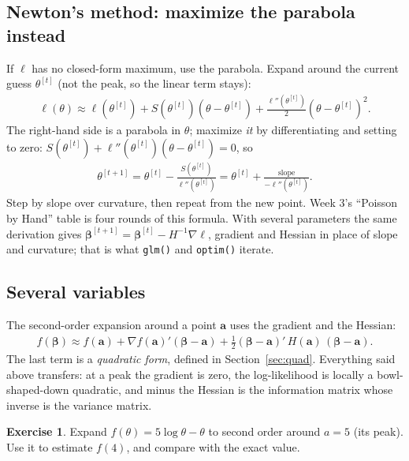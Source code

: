 \documentclass[11pt]{article}
\theoremstyle{definition}
\newtheorem{exercise}{Exercise}
\newcommand{\loglik}{\ell}
\newcommand{\bbeta}{\bm{\beta}}
\begin{document}
\subsection{Newton's method: maximize the parabola instead}

If $\loglik$ has no closed-form maximum, use the parabola. Expand around
the current guess $\theta^{[t]}$ (not the peak, so the linear term stays):
\begin{align*}
  \loglik(\theta) \approx \loglik(\theta^{[t]}) + S(\theta^{[t]})(\theta - \theta^{[t]})
  + \frac{\loglik''(\theta^{[t]})}{2}(\theta - \theta^{[t]})^2 .
\end{align*}
The right-hand side is a parabola in $\theta$; maximize \emph{it} by
differentiating and setting to zero:
$S(\theta^{[t]}) + \loglik''(\theta^{[t]})(\theta - \theta^{[t]}) = 0$, so
\begin{align*}
  \theta^{[t+1]} = \theta^{[t]} - \frac{S(\theta^{[t]})}{\loglik''(\theta^{[t]})}
  = \theta^{[t]} + \frac{\text{slope}}{-\loglik''(\theta^{[t]})} .
\end{align*}
Step by slope over curvature, then repeat from the new point. Week 3's
``Poisson by Hand'' table is four rounds of this formula. With several
parameters the same derivation gives
$\bbeta^{[t+1]} = \bbeta^{[t]} - H^{-1}\nabla\loglik$, gradient and Hessian in
place of slope and curvature; that is what \texttt{glm()} and
\texttt{optim()} iterate.

\subsection{Several variables}

The second-order expansion around a point $\bm a$ uses the gradient and the
Hessian:
\begin{align*}
  f(\bbeta) \approx f(\bm a) + \nabla f(\bm a)'(\bbeta - \bm a)
  + \frac12(\bbeta - \bm a)'\,H(\bm a)\,(\bbeta - \bm a).
\end{align*}
The last term is a \emph{quadratic form}, defined in
Section~\ref{sec:quad}. Everything said above transfers: at a peak the
gradient is zero, the log-likelihood is locally a bowl-shaped-down
quadratic, and minus the Hessian is the information matrix whose inverse is
the variance matrix.

\begin{exercise}
Expand $f(\theta) = 5\log\theta - \theta$ to second order around $a = 5$
(its peak). Use it to estimate $f(4)$, and compare with the exact value.
\end{exercise}
\end{document}
